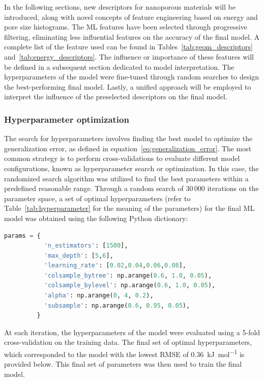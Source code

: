 \documentclass[main]{subfiles}
\begin{document}
In the following sections, new descriptors for nanoporous materials will be introduced, along with novel concepts of feature engineering based on energy and pore size histograms. The ML features have been selected through progressive filtering, eliminating less influential features on the accuracy of the final model. A complete list of the feature used can be found in Tables~\ref{tab:geom_descriptors} and~\ref{tab:energy_descriptors}. The influence or importance of these features will be defined in a subsequent section dedicated to model interpretation. The hyperparameters of the model were fine-tuned through random searches to design the best-performing final model. Lastly, a unified approach will be employed to interpret the influence of the preselected descriptors on the final model.

\subsubsection{Hyperparameter optimization}\label{sct:hyperparameter}

The search for hyperparameters involves finding the best model to optimize the generalization error, as defined in equation~\ref{eq:generalization_error}. The most common strategy is to perform cross-validations to evaluate different model configurations, known as hyperparameter search or optimization. In this case, the randomized search algorithm was utilized to find the best parameters within a predefined reasonable range. Through a random search of 30\,000 iterations on the parameter space, a set of optimal hyperparameters (refer to Table~\ref{tab:hyperparameter} for the meaning of the parameters) for the final ML model was obtained using the following Python dictionary:

\begin{lstlisting}[language=Python]
params = {
           'n_estimators': [1500],
           'max_depth': [5,6],
           'learning_rate': [0.02,0.04,0.06,0.08],
           'colsample_bytree': np.arange(0.6, 1.0, 0.05),
           'colsample_bylevel': np.arange(0.6, 1.0, 0.05),
           'alpha': np.arange(0, 4, 0.2),
           'subsample': np.arange(0.6, 0.95, 0.05),
         }
\end{lstlisting}

At each iteration, the hyperparameters of the model were evaluated using a 5-fold cross-validation on the training data. The final set of optimal hyperparameters, which corresponded to the model with the lowest RMSE of \SI{0.36}{\kilo\joule\per\mole} is provided below. This final set of parameters was then used to train the final model.
\end{document}
